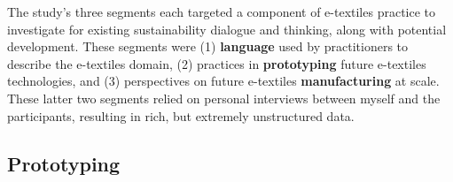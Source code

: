 The study's three segments each targeted a component of e-textiles practice to investigate for existing sustainability dialogue and thinking, along with potential development. These segments were (1) \textbf{language} used by practitioners to describe the e-textiles domain, (2) practices in \textbf{prototyping} future e-textiles technologies, and (3) perspectives on future e-textiles \textbf{manufacturing} at scale. These latter two segments relied on personal interviews between myself and the participants, resulting in rich, but extremely unstructured data.

\subsection{Prototyping}


